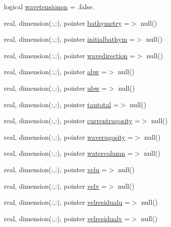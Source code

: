 \begin{DoxyCompactItemize}
\item 
logical \mbox{\hyperlink{structmodulesand_1_1t__external_a7d7ad86a4ea8e74a75fe6dc8f8e578c8}{wavetensionon}} = .false.
\item 
real, dimension(\+:,\+:), pointer \mbox{\hyperlink{structmodulesand_1_1t__external_a3f60d0b5500a275d97ca406d142f8fb0}{bathymetry}} =$>$ null()
\item 
real, dimension(\+:,\+:), pointer \mbox{\hyperlink{structmodulesand_1_1t__external_aedd4aad1045feb279869d20ec0b24110}{initialbathym}} =$>$ null()
\item 
real, dimension(\+:,\+:), pointer \mbox{\hyperlink{structmodulesand_1_1t__external_a3dd7081968fdd75d76fada5cca0f0e22}{wavedirection}} =$>$ null()
\item 
real, dimension(\+:,\+:), pointer \mbox{\hyperlink{structmodulesand_1_1t__external_a4c73f602711bfc0939219dfe4cbbbfcc}{abw}} =$>$ null()
\item 
real, dimension(\+:,\+:), pointer \mbox{\hyperlink{structmodulesand_1_1t__external_a8573121f41f3fa0d90b0c1a176173696}{ubw}} =$>$ null()
\item 
real, dimension(\+:,\+:), pointer \mbox{\hyperlink{structmodulesand_1_1t__external_a402eec34ae21830bd59a81de6c1992d2}{tautotal}} =$>$ null()
\item 
real, dimension(\+:,\+:), pointer \mbox{\hyperlink{structmodulesand_1_1t__external_a57dd33913f933527447dd178458be62e}{currentrugosity}} =$>$ null()
\item 
real, dimension(\+:,\+:), pointer \mbox{\hyperlink{structmodulesand_1_1t__external_a905a1caf4a7db38a8500705753f0182c}{waverugosity}} =$>$ null()
\item 
real, dimension(\+:,\+:), pointer \mbox{\hyperlink{structmodulesand_1_1t__external_afaa293c778d6b2911f2adb19bd6a7796}{watercolumn}} =$>$ null()
\item 
real, dimension(\+:,\+:), pointer \mbox{\hyperlink{structmodulesand_1_1t__external_a167dd909efc56143cd9feb0da7b5da5e}{velu}} =$>$ null()
\item 
real, dimension(\+:,\+:), pointer \mbox{\hyperlink{structmodulesand_1_1t__external_a08fed3a1f86cbde38a0f24e550865abf}{velv}} =$>$ null()
\item 
real, dimension(\+:,\+:), pointer \mbox{\hyperlink{structmodulesand_1_1t__external_ae986bacb5b8765b7c5c8d15fa9327602}{velresidualu}} =$>$ null()
\item 
real, dimension(\+:,\+:), pointer \mbox{\hyperlink{structmodulesand_1_1t__external_a9aac6933f4c5daa0925b8baf9e2db64f}{velresidualv}} =$>$ null()

\end{DoxyCompactItemize}
